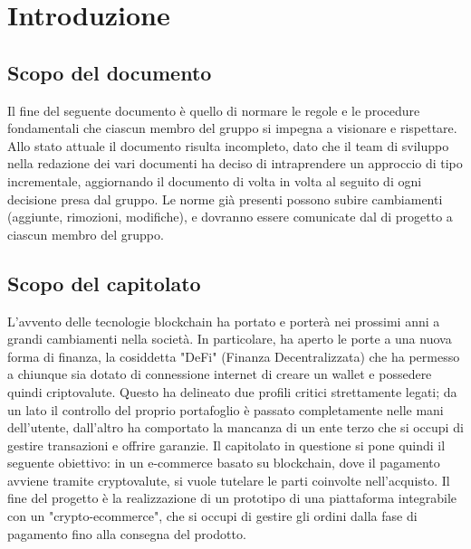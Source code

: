 \section{Introduzione} \label{section: introduzione}

\subsection {Scopo del documento}
Il fine del seguente documento è quello di normare le regole e le procedure fondamentali che ciascun membro del gruppo \groupName{} si impegna a visionare e rispettare.
Allo stato attuale il documento risulta incompleto, dato che il team di sviluppo nella redazione dei vari documenti ha deciso di intraprendere un approccio di tipo incrementale, aggiornando il documento di volta in volta al seguito di ogni decisione presa dal gruppo.
Le norme già presenti possono subire cambiamenti (aggiunte, rimozioni, modifiche), e dovranno essere comunicate dal \roleProjectManagerLow{} di progetto a ciascun membro del gruppo.

\vspace{1cm}

\subsection{Scopo del capitolato}
L'avvento delle tecnologie blockchain\glo{} ha portato e porterà nei prossimi anni a grandi cambiamenti nella società.
In particolare, ha aperto le porte a una nuova forma di finanza, la cosiddetta "DeFi" (Finanza Decentralizzata) che ha permesso a chiunque sia dotato di connessione internet di creare un wallet\glo{} e possedere quindi criptovalute\glo{}.
Questo ha delineato due profili critici strettamente legati; da un lato il controllo del proprio portafoglio è passato completamente nelle mani dell'utente, dall'altro ha comportato la mancanza di un ente terzo che si occupi di gestire transazioni e offrire garanzie.
\newline
Il capitolato in questione si pone quindi il seguente obiettivo: in un e-commerce\glo{} basato su blockchain\glo{}, dove il pagamento avviene tramite cryptovalute\glo{}, si vuole tutelare le parti coinvolte nell'acquisto.
\newline
Il fine del progetto è la realizzazione di un prototipo di una piattaforma integrabile con un "crypto-ecommerce\glo{}", che si occupi di gestire gli ordini dalla fase di pagamento fino alla consegna del prodotto.

\vspace{1cm}

